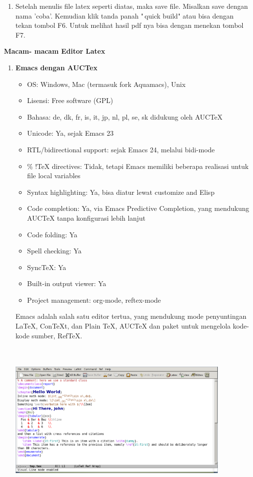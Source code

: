 \documentclass[12pt,a4paper]{article}
\begin{document}
\begin{enumerate}
\setcounter{enumi}{\thenumberedCntC}
\item Setelah menulis file latex seperti diatas, maka save file. Misalkan save dengan nama 'coba'. Kemudian klik tanda panah "\,quick build" atau bisa dengan tekan tombol F6. Untuk melihat hasil pdf nya bisa dengan menekan tombol F7.
\setcounter{numberedCntC}{\theenumi}
\end{enumerate}
\textbf{Macam- macam Editor Latex}

\begin{enumerate}
\item \textbf{Emacs dengan AUCTex}
\begin{itemize}
\item OS: Windows, Mac (termasuk fork Aquamacs), Unix
\item Lisensi: Free software (GPL)
\item Bahasa: de, dk, fr, is, it, jp, nl, pl, se, sk didukung oleh AUCTeX
\item Unicode: Ya, sejak Emacs 23
\item RTL/bidirectional support: sejak Emacs 24, melalui bidi-mode
\item \% !TeX directives: Tidak, tetapi Emacs memiliki beberapa realisasi untuk file local variables
\item Syntax highlighting: Ya, bisa diatur lewat customize and Elisp
\item Code completion: Ya, via Emacs Predictive Completion, yang mendukung AUCTeX tanpa konfigurasi lebih lanjut
\item Code folding: Ya
\item Spell checking: Ya
\item SyncTeX: Ya
\item Built-in output viewer: Ya
\item Project management: org-mode, reftex-mode
\end{itemize}
\hspace{0,5in}Emacs adalah salah satu editor tertua, yang mendukung mode penyuntingan LaTeX, ConTeXt, dan Plain TeX, AUCTeX dan paket untuk mengelola kode-kode sumber, RefTeX.

\includegraphics[width=10.95cm,height=7.87cm]{gambar/image2.jpg}
\par \vspace{12pt}


\end{enumerate}
\end{document}
